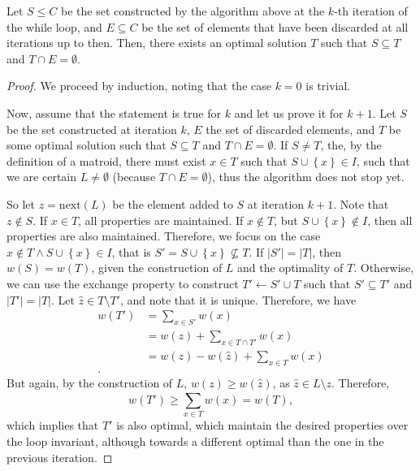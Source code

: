 \begin{lemma}
    Let $S\le C$ be the set constructed by the algorithm above at the $k$-th iteration of the while loop, and $E\subseteq C$ be the set of elements that have been discarded at all iterations up to then.
    Then, there exists an optimal solution $T$ such that $S \subseteq T$ and $T \cap E = \emptyset $.
\end{lemma}
\begin{proof}
    We proceed by induction, noting that the case $k=0$ is trivial.

    Now, assume that the statement is true for $k$ and let us prove it for $k+1$.
    Let $S$ be the set constructed at iteration $k$, $E$ the set of discarded elements, and $T$ be some optimal solution such that $S \subseteq T$ and $T \cap E = \emptyset$.
    If $S \neq T$, the, by the definition of a matroid, there must exist $x \in T$ such that $S\cup \left\{ x \right\} \in I$, such that we are certain $L \neq \emptyset$ (because $T \cap E = \emptyset$), thus the algorithm does not stop yet.

    So let $z = \text{next}(L)$ be the element added to $S$ at iteration $k+1$.
    Note that $z \not\in S$.
    If $x \in T$, all properties are maintained.
    If $x \not\in T$, but $S\cup \left\{ x \right\} \not\in I$, then all properties are also maintained.
    Therefore, we focus on the case $x \not\in T \land S\cup \left\{ x \right\} \in I$, that is $S'=S \cup \left\{ x \right\} \not\subseteq T$.
    If $|S'| = |T|$, then $w(S) = w(T)$, given the construction of $L$ and the optimality of $T$.
    Otherwise, we can use the exchange property to construct $T' \gets S' \cup T$ such that $S'\subseteq T'$ and $|T'| = |T|$.
    Let $\hat{z} \in T \setminus T'$, and note that it is unique.
    Therefore, we have
    \begin{align*}
        w(T') &= \sum_{x \in S'} w(x) \\
	&= w(z) + \sum_{x \in T\cap T'} w(x) \\
	&= w(z) - w(\hat{z}) + \sum_{x \in T}^{} w(x) \\
    .\end{align*}
    But again, by the construction of $L$, $w(z) \ge w(\hat{z})$, as $\hat{z} \in L \setminus z$.
    Therefore, \[
    w(T') \ge  \sum_{x\in T}^{} w(x) = w(T)
    ,\] which implies that $T'$ is also optimal, which maintain the desired properties over the loop invariant, although towards a different optimal than the one in the previous iteration.
\end{proof}


